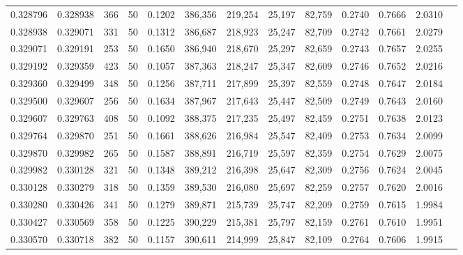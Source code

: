 \begin{tabular}{rrrrrrrrrrrrr}
0.328796 & 0.328938 &   366 &  50 &                                     0.1202 & 386,356 & 219,254 &  25,197 &  82,759 & 0.2740 & 0.7666 & 2.0310 \\
0.328938 & 0.329071 &   331 &  50 &                                     0.1312 & 386,687 & 218,923 &  25,247 &  82,709 & 0.2742 & 0.7661 & 2.0279 \\
0.329071 & 0.329191 &   253 &  50 &                                     0.1650 & 386,940 & 218,670 &  25,297 &  82,659 & 0.2743 & 0.7657 & 2.0255 \\
0.329192 & 0.329359 &   423 &  50 &                                     0.1057 & 387,363 & 218,247 &  25,347 &  82,609 & 0.2746 & 0.7652 & 2.0216 \\
0.329360 & 0.329499 &   348 &  50 &                                     0.1256 & 387,711 & 217,899 &  25,397 &  82,559 & 0.2748 & 0.7647 & 2.0184 \\
0.329500 & 0.329607 &   256 &  50 &                                     0.1634 & 387,967 & 217,643 &  25,447 &  82,509 & 0.2749 & 0.7643 & 2.0160 \\
0.329607 & 0.329763 &   408 &  50 &                                     0.1092 & 388,375 & 217,235 &  25,497 &  82,459 & 0.2751 & 0.7638 & 2.0123 \\
0.329764 & 0.329870 &   251 &  50 &                                     0.1661 & 388,626 & 216,984 &  25,547 &  82,409 & 0.2753 & 0.7634 & 2.0099 \\
0.329870 & 0.329982 &   265 &  50 &                                     0.1587 & 388,891 & 216,719 &  25,597 &  82,359 & 0.2754 & 0.7629 & 2.0075 \\
0.329982 & 0.330128 &   321 &  50 &                                     0.1348 & 389,212 & 216,398 &  25,647 &  82,309 & 0.2756 & 0.7624 & 2.0045 \\
0.330128 & 0.330279 &   318 &  50 &                                     0.1359 & 389,530 & 216,080 &  25,697 &  82,259 & 0.2757 & 0.7620 & 2.0016 \\
0.330280 & 0.330426 &   341 &  50 &                                     0.1279 & 389,871 & 215,739 &  25,747 &  82,209 & 0.2759 & 0.7615 & 1.9984 \\
0.330427 & 0.330569 &   358 &  50 &                                     0.1225 & 390,229 & 215,381 &  25,797 &  82,159 & 0.2761 & 0.7610 & 1.9951 \\
0.330570 & 0.330718 &   382 &  50 &                                     0.1157 & 390,611 & 214,999 &  25,847 &  82,109 & 0.2764 & 0.7606 & 1.9915 \\

\end{tabular}
